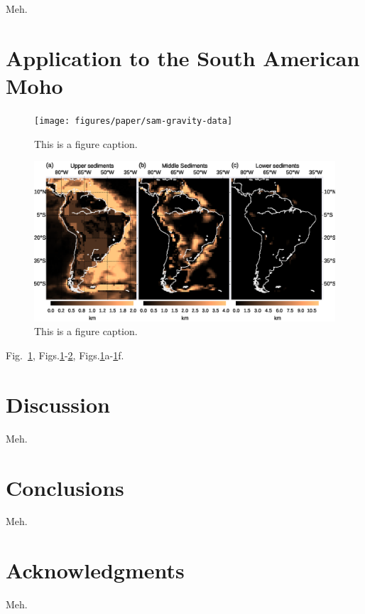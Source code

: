 \documentclass[extra]{gji}
\newcommand{\fig}[1]{Fig.~\ref{fig:#1}}
\newcommand{\figs}[2]{Figs.\ref{fig:#1}-\ref{fig:#2}}
\newcommand{\subfigs}[3]{Figs.\ref{fig:#1}#2-\ref{fig:#1}#3}
\begin{document}
Meh.


\section{Application to the South American Moho}

\begin{figure}
    \centering
    \texttt{[image: figures/paper/sam-gravity-data]}
    \caption{This is a figure caption.}
    \label{fig:sam-data}
\end{figure}

\begin{figure}
    \centering
    \includegraphics[width=\textwidth]{figures/paper/sam-gravity-sed}
    \caption{This is a figure caption.}
    \label{fig:sam-sed}
\end{figure}

\fig{sam-data}, \figs{sam-data}{sam-sed}, \subfigs{sam-data}{a}{f}.

\section{Discussion}

Meh.

\section{Conclusions}

Meh.

\section{Acknowledgments}

Meh.



\end{document}

